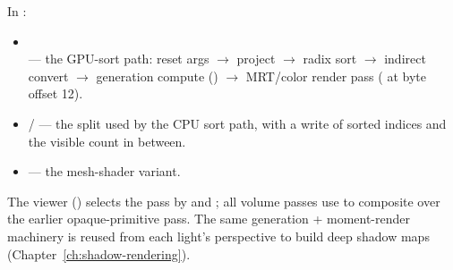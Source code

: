In :
\begin{itemize}
\item {}\\
  --- the GPU-sort
  path: reset args $\to$ project $\to$ radix sort $\to$ indirect convert
  $\to$ generation compute () $\to$
  MRT/color render pass ( at byte offset 12).
\item {} /
   --- the split used by the CPU
  sort path, with a  write of sorted indices and the
  visible count in between.
\item {} --- the mesh-shader
  variant.
\end{itemize}

The viewer () selects the pass by
 and ; all volume passes use
 to composite over the earlier opaque-primitive pass.
The same generation + moment-render machinery is reused from each light's
perspective to build deep shadow maps (Chapter~\ref{ch:shadow-rendering}).


